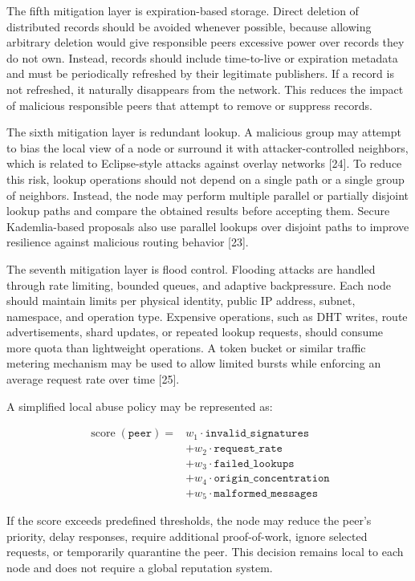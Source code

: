 \documentclass[12pt,a4paper]{article}
\begin{document}
The fifth mitigation layer is expiration-based storage. Direct deletion of
distributed records should be avoided whenever possible, because allowing arbitrary
deletion would give responsible peers excessive power over records they do not own.
Instead, records should include time-to-live or expiration metadata and must be
periodically refreshed by their legitimate publishers. If a record is not refreshed,
it naturally disappears from the network. This reduces the impact of malicious
responsible peers that attempt to remove or suppress records.

The sixth mitigation layer is redundant lookup. A malicious group may attempt to
bias the local view of a node or surround it with attacker-controlled neighbors,
which is related to Eclipse-style attacks against overlay networks [24]. To reduce
this risk, lookup operations should not depend on a single path or a single group of
neighbors. Instead, the node may perform multiple parallel or partially disjoint
lookup paths and compare the obtained results before accepting them. Secure
Kademlia-based proposals also use parallel lookups over disjoint paths to improve
resilience against malicious routing behavior [23].

The seventh mitigation layer is flood control. Flooding attacks are handled through
rate limiting, bounded queues, and adaptive backpressure. Each node should maintain
limits per physical identity, public IP address, subnet, namespace, and operation
type. Expensive operations, such as DHT writes, route advertisements, shard updates,
or repeated lookup requests, should consume more quota than lightweight operations.
A token bucket or similar traffic metering mechanism may be used to allow limited
bursts while enforcing an average request rate over time [25].

A simplified local abuse policy may be represented as:

\[
\begin{aligned}
\operatorname{score}(\texttt{peer}) ={}&
w_1 \cdot \texttt{invalid\_signatures} \\
&+ w_2 \cdot \texttt{request\_rate} \\
&+ w_3 \cdot \texttt{failed\_lookups} \\
&+ w_4 \cdot \texttt{origin\_concentration} \\
&+ w_5 \cdot \texttt{malformed\_messages}
\end{aligned}
\]

If the score exceeds predefined thresholds, the node may reduce the peer's priority,
delay responses, require additional proof-of-work, ignore selected requests, or
temporarily quarantine the peer. This decision remains local to each node and does
not require a global reputation system.
\end{document}
